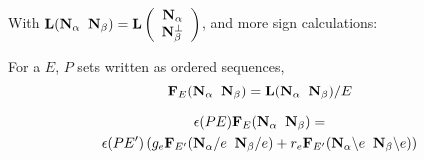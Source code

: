 \documentclass{beamer}
\newcommand{\ext}[1]{\ensuremath{\mathbf{#1}}}
\begin{document}
\begin{frame}
\end{frame}




\begin{frame}
  With $\ext{L}(\eNal\;\; \eNbe)=\ext{L}\left(\begin{array}{c}\eNal \\ \eNbePe \end{array} \right)$, and more sign calculations:
    \begin{definition}
      For a $E$, $P$ sets written as ordered sequences,
      \[
      \ext{F}_E(\eNal\;\;\eNbe) = \ext{L}(\eNal\;\;\eNbe)/E
      \]
    \end{definition}
    \begin{theorem}
      \begin{multline*}
        \epsilon(PE)\ext{F}_E(\eNal\;\;\eNbe)=\\
        \epsilon(PE')
        \left(g_e\ext{F}_{E'}(\eNal/e\;\; \eNbe/e) +
      r_e\ext{F}_{E'}(\eNal\backslash e\;\; \eNbe\backslash e)\right)
      \end{multline*}
  \end{theorem}
\end{frame}
\end{document}

